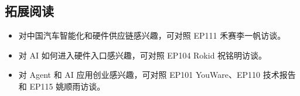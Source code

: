\subsection{拓展阅读}

\begin{itemize}
\item 对中国汽车智能化和硬件供应链感兴趣，可对照 EP111 禾赛李一帆访谈。
\item 对 AI 如何进入硬件入口感兴趣，可对照 EP104 Rokid 祝铭明访谈。
\item 对 Agent 和 AI 应用创业感兴趣，可对照 EP101 YouWare、EP110 技术报告和 EP115 姚顺雨访谈。
\end{itemize}



